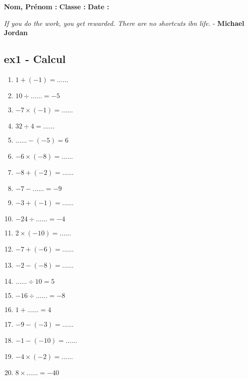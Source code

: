 \documentclass[12pt]{article}
\begin{document}
\newcommand{\Pointilles}[1][3]{%
  \multido{}{#1}{\makebox[\linewidth]{\dotfill}\\[\parskip]
}}

\setlength{\columnseprule}{1pt}

\textbf{Nom, Prénom :} \hspace{8cm} \textbf{Classe :} \hspace{3cm} \textbf{Date :}\\

\begin{center}
  \textit{If you do the work, you get rewarded. There are no shortcuts ibn life.}  - \textbf{Michael Jordan}
\end{center}


\subsection*{ex1 - Calcul}

\begin{multicols}{3}\noindent

  \begin{enumerate}
  \item $1 + \left( -1\right) = \ldots\ldots$
  \item $10 \div \ldots\ldots = -5$
  \item $-7 \times \left( -1\right) = \ldots\ldots$
  \item $32 \div 4 = \ldots\ldots$
  \item $\ldots\ldots - \left( -5\right) = 6$
  \item $-6 \times \left( -8\right) = \ldots\ldots$
  \item $-8 + \left( -2\right) = \ldots\ldots$
  \item $-7 - \ldots\ldots = -9$
  \item $-3 + \left( -1\right) = \ldots\ldots$
  \item $-24 \div \ldots\ldots = -4$
  \item $2 \times \left( -10\right) = \ldots\ldots$
  \item $-7 + \left( -6\right) = \ldots\ldots$
  \item $-2 - \left( -8\right) = \ldots\ldots$
  \item $\ldots\ldots \div 10 = 5$
  \item $-16 \div \ldots\ldots = -8$
  \item $1 + \ldots\ldots = 4$
  \item $-9 - \left( -3\right) = \ldots\ldots$
  \item $-1 - \left( -10\right) = \ldots\ldots$
  \item $-4 \times \left( -2\right) = \ldots\ldots$
  \item $8 \times \ldots\ldots = -40$
  \end{enumerate}
  
\end{multicols}
\end{document}
